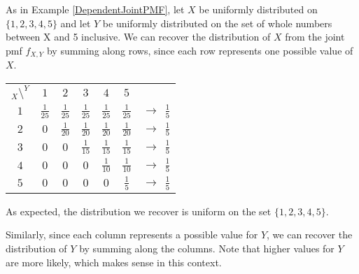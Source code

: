 \begin{examp} As in Example \ref{DependentJointPMF}, let $X$ be uniformly distributed on $\{1,2,3,4,5\}$ and let $Y$ be uniformly distributed on the set of whole numbers between X and 5 inclusive. We can recover the distribution of $X$ from the joint pmf $f_{X,Y}$ by summing along rows, since each row represents one possible value of $X$.

\begin{center}
\renewcommand{\arraystretch}{1.5}
\begin{tabular}{c|cccccc}
$_{X} \setminus ^Y$ & $1$ & $2$ & $3$ & $4$ & $5$  & \\
\cline{1-6}
$1$ & $\frac{1}{25}$ & $\frac{1}{25}$ & $\frac{1}{25}$ & $\frac{1}{25}$ & $\frac{1}{25}$ & ${\rightarrow}\ \ \frac{1}{5}$ \\
$2$ & $0$ & $\frac{1}{20}$ & $\frac{1}{20}$ & $\frac{1}{20}$ & $\frac{1}{20}$ & ${\rightarrow}\ \ \frac{1}{5}$ \\
$3$ & $0$ & $0$ & $\frac{1}{15}$ & $\frac{1}{15}$ & $\frac{1}{15}$ & ${\rightarrow}\ \ \frac{1}{5}$ \\
$4$ & $0$ & $0$ & $0$ & $\frac{1}{10}$ & $\frac{1}{10}$ & ${\rightarrow}\ \ \frac{1}{5}$ \\
$5$ & $0$ & $0$ & $0$ & $0$ & $\frac{1}{5}$  & ${\rightarrow}\  \ \frac{1}{5}$\\
\end{tabular}
\renewcommand{\arraystretch}{1}
\end{center}

\noindent As expected, the distribution we recover is uniform on the set $\{1,2,3,4,5\}$. 
\par
\noindent Similarly, since each column represents a possible value for $Y$, we can recover the distribution of $Y$ by summing along the columns. Note that higher values for $Y$ are more likely, which makes sense in this context.


\end{examp}
